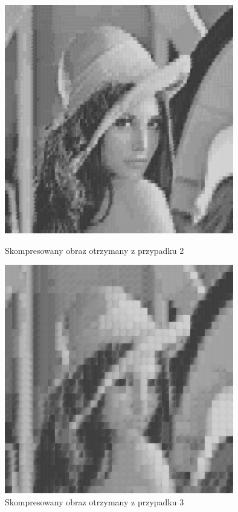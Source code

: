 \documentclass[12pt]{article}
\begin{document}
\begin{figure}[h!]
 \centering
 
 \includegraphics[width=10cm]{CB_neurons=40_block_size=8x8.png}
 \vspace{-0.3cm}
 \caption{Skompresowany obraz otrzymany z przypadku 2}
 \vspace*{\floatsep}

 \includegraphics[width=10cm]{CB_neurons=40_block_size=16x16.png}
 \vspace{-0.3cm}
 \caption{Skompresowany obraz otrzymany z przypadku 3}

\end{figure}
\clearpage

\end{document}
